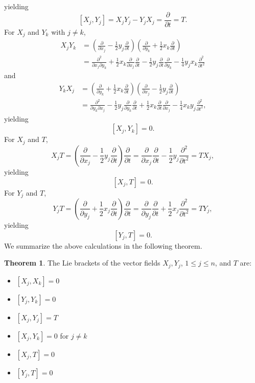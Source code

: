 \documentclass{article}
\theoremstyle{definition}
\newtheorem{theorem}{Theorem}
\theoremstyle{definition}
\begin{document}
yielding
\[
[X_j,Y_j]=X_jY_j-Y_jX_j = \frac{\partial}{\partial t} =T.
\]
For $X_j$ and $Y_k$ with $j \neq k$,
\begin{align*}
X_jY_k&=\left( \frac{\partial}{\partial x_j} - \frac{1}{2}y_j \frac{\partial}{\partial t}\right)
\left( \frac{\partial}{\partial y_k} + \frac{1}{2}x_k \frac{\partial}{\partial t}\right)\\
&=\frac{\partial^2}{\partial x_j \partial y_k} +\frac{1}{2}x_k \frac{\partial}{\partial x_j} \frac{\partial}{\partial t}
-\frac{1}{2}y_j \frac{\partial}{\partial t}  \frac{\partial}{\partial y_k} 
-\frac{1}{4} y_j x_k \frac{\partial^2}{\partial t^2}
\end{align*}
and
\begin{align*}
Y_k X_j&=\left( \frac{\partial}{\partial y_k} + \frac{1}{2}x_k \frac{\partial}{\partial t}\right)\left( \frac{\partial}{\partial x_j} - \frac{1}{2}y_j \frac{\partial}{\partial t}\right)\\
&=\frac{\partial^2}{\partial y_k \partial x_j} - \frac{1}{2} y_j \frac{\partial}{\partial y_k} \frac{\partial}{\partial t}
+\frac{1}{2}x_k \frac{\partial}{\partial t} \frac{\partial}{\partial x_j}
-\frac{1}{4} x_k y_j \frac{\partial^2}{\partial t^2},
\end{align*}
yielding
\[
[X_j,Y_k]=0.
\]
For $X_j$ and $T$,
\[
X_j T = \left(\frac{\partial}{\partial x_j} - \frac{1}{2}y_j \frac{\partial}{\partial t}\right)
\frac{\partial}{\partial t}
=\frac{\partial}{\partial x_j} \frac{\partial}{\partial t} - \frac{1}{2} y_j \frac{\partial^2}{\partial t^2}
=TX_j,
\]
yielding
\[
[X_j,T] = 0.
\]
For $Y_j$ and $T$, 
\[
Y_j T = \left(\frac{\partial}{\partial y_j} + \frac{1}{2}x_j \frac{\partial}{\partial t}\right) \frac{\partial}{\partial t}
=\frac{\partial}{\partial y_j} \frac{\partial}{\partial t} + \frac{1}{2} x_j \frac{\partial^2}{\partial t^2}=TY_j,
\]
yielding
\[
[Y_j,T]=0.
\]
We summarize the above calculations in the following theorem.

\begin{theorem}
The Lie brackets of the vector fields $X_j,Y_j$, $1 \leq j \leq n$, and $T$ are:
\begin{itemize}
\item $[X_j,X_k]=0$
\item $[Y_j,Y_k]=0$
\item $[X_j,Y_j]=T$
\item $[X_j,Y_k]=0$ for $j \neq k$
\item $[X_j,T]=0$
\item $[Y_j,T]=0$
\end{itemize}
\end{theorem}
\end{document}
